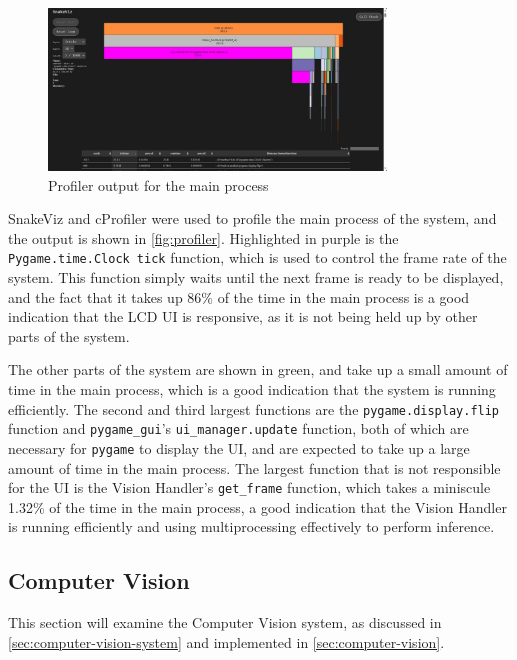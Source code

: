 \begin{figure}[H]
  \centering
  \includegraphics[width=0.8\textwidth]{imgs/software/profiler.jpg}
  \caption{Profiler output for the main process}
  \label{fig:profiler}
\end{figure}

SnakeViz \cite{snakeviz} and cProfiler were used to profile the main process of the system, and the output is shown in \autoref{fig:profiler}. Highlighted in purple is the \texttt{Pygame.time.Clock tick} function, which is used to control the frame rate of the system. This function simply waits until the next frame is ready to be displayed, and the fact that it takes up 86\% of the time in the main process is a good indication that the LCD UI is responsive, as it is not being held up by other parts of the system.

The other parts of the system are shown in green, and take up a small amount of time in the main process, which is a good indication that the system is running efficiently. The second and third largest functions are the \texttt{pygame.display.flip} function and \texttt{pygame\_gui}'s \texttt{ui\_manager.update} function, both of which are necessary for \texttt{pygame} to display the UI, and are expected to take up a large amount of time in the main process. The largest function that is not responsible for the UI is the Vision Handler's \texttt{get\_frame} function, which takes a miniscule 1.32\% of the time in the main process, a good indication that the Vision Handler is running efficiently and using multiprocessing effectively to perform inference.

\subsection{Computer Vision}
\label{sec:computer-vision-evaluation}
This section will examine the Computer Vision system, as discussed in \autoref{sec:computer-vision-system} and implemented in \autoref{sec:computer-vision}.


